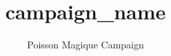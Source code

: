 \documentclass[oneside,openright,titlepage,dottedtoc,numbers=noenddot,headinclude,footinclude=true,cleardoublepage=empty,abstractoff,paper=letter,fontsize=11pt,american]{scrartcl}
\begin{document}

\title{{{ campaign_name }}}
\date{Poisson Magique Campaign}
\maketitle


\end{document}
